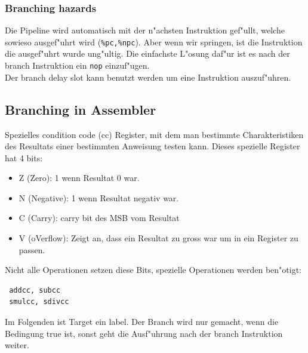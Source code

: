 \documentclass[german, 10pt, a4paper, twocolumn]{scrartcl}
\begin{document}
\subsubsection{Branching hazards}

Die Pipeline wird automatisch mit der n"achsten Instruktion gef"ullt, welche sowieso ausgef"uhrt wird (\verb#%pc,%npc#). Aber wenn wir springen, ist die Instruktion die ausgef"uhrt wurde ung"ultig. Die einfachste L"osung daf"ur ist es nach der branch Instruktion ein \verb#nop# einzuf"ugen.\\
Der branch delay slot kann benutzt werden um eine Instruktion auszuf"uhren.

\subsection{Branching in Assembler}

Spezielles condition code (cc) Register, mit dem man bestimmte Charakteristiken des Resultats einer bestimmten Anweisung testen kann. Dieses spezielle Register hat 4 bits:
\begin{itemize}
	\item Z (Zero): 1 wenn Resultat 0 war.
	\item N (Negative): 1 wenn Resultat negativ war.
	\item C (Carry): carry bit des MSB vom Resultat
	\item V (oVerflow): Zeigt an, dass ein Resultat zu gross war um in ein Register zu passen.
\end{itemize}

Nicht alle Operationen setzen diese Bits, spezielle Operationen werden ben"otigt:
\begin{verbatim}
 addcc, subcc
 smulcc, sdivcc
\end{verbatim}

Im Folgenden ist Target ein label. Der Branch wird nur gemacht, wenn die Bedingung true ist, sonst geht die Ausf"uhrung nach der branch Instruktion weiter.\\
\end{document}
